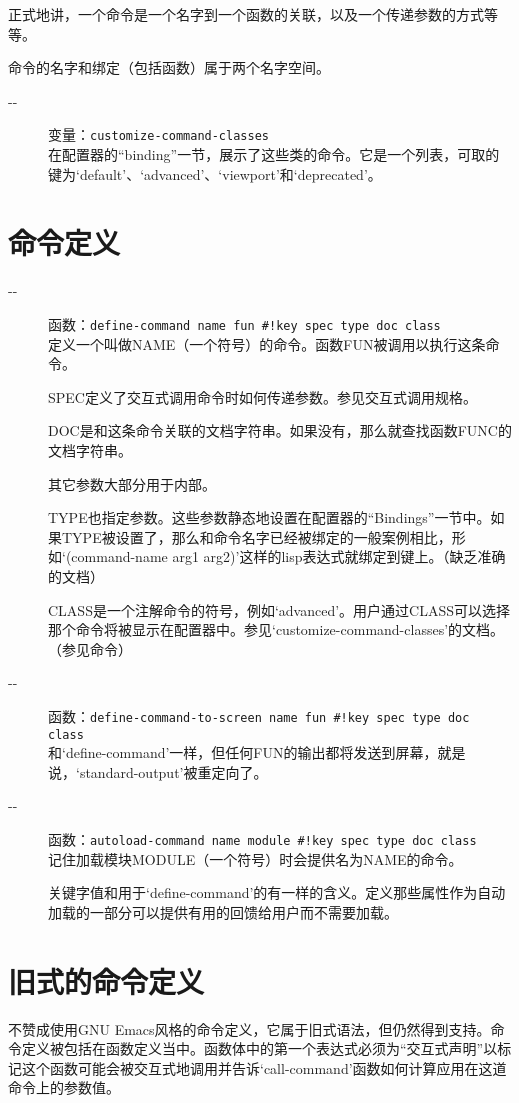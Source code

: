 \documentclass{book}
\begin{document}
\begin{CJK*}{UTF8}{gbsn}
正式地讲，一个命令是一个名字到一个函数的关联，以及一个传递参数的方式等等。

命令的名字和绑定（包括函数）属于两个名字空间。
\begin{description}
\item[-{}-] 变量：\verb|customize-command-classes|\\
在配置器的``binding''一节，展示了这些类的命令。它是一个列表，可取的键为`default'、`advanced'、`viewport'和`deprecated'。
\end{description}
\section{命令定义}
\begin{description}
\item[-{}-] 函数：\verb|define-command name fun #!key spec type doc class|\\
定义一个叫做NAME（一个符号）的命令。函数FUN被调用以执行这条命令。

SPEC定义了交互式调用命令时如何传递参数。参见交互式调用规格。

DOC是和这条命令关联的文档字符串。如果没有，那么就查找函数FUNC的文档字符串。

其它参数大部分用于内部。

TYPE也指定参数。这些参数静态地设置在配置器的``Bindings''一节中。如果TYPE被设置了，那么和命令名字已经被绑定的一般案例相比，形如`(command-name arg1 arg2)'这样的lisp表达式就绑定到键上。（缺乏准确的文档）

CLASS是一个注解命令的符号，例如`advanced'。用户通过CLASS可以选择那个命令将被显示在配置器中。参见`customize-command-classes'的文档。（参见命令）
\item[-{}-] 函数：\verb|define-command-to-screen name fun #!key spec type doc class|\\
和`define-command'一样，但任何FUN的输出都将发送到屏幕，就是说，`standard-output'被重定向了。
\item[-{}-] 函数：\verb|autoload-command name module #!key spec type doc class|\\
记住加载模块MODULE（一个符号）时会提供名为NAME的命令。

关键字值和用于`define-command'的有一样的含义。定义那些属性作为自动加载的一部分可以提供有用的回馈给用户而不需要加载。
\end{description}
\section{旧式的命令定义}
不赞成使用GNU Emacs风格的命令定义，它属于旧式语法，但仍然得到支持。命令定义被包括在函数定义当中。函数体中的第一个表达式必须为``交互式声明''以标记这个函数可能会被交互式地调用并告诉`call-command'函数如何计算应用在这道命令上的参数值。


\end{CJK*}
\end{document}
